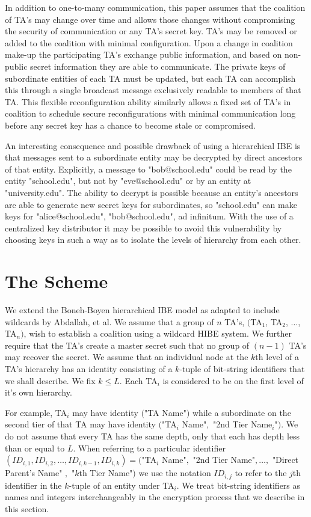 \documentclass[10pt]{article}
\begin{document}
In addition to one-to-many communication, this paper assumes that the coalition of TA's may change over time and allows those changes without compromising the security of communication or any TA's secret key.  TA's may be removed or added to the coalition with minimal configuration.  Upon a change in coalition make-up the participating TA's exchange public information, and based on non-public secret information they are able to communicate.  The private keys of subordinate entities of each TA must be updated, but each TA can accomplish this through a single broadcast message exclusively readable to members of that TA.  This flexible reconfiguration ability similarly allows a fixed set of TA's in coalition to schedule secure reconfigurations with minimal communication long before any secret key has a chance to become stale or compromised.

An interesting consequence and possible drawback of using a hierarchical IBE is that messages sent to a subordinate entity may be decrypted by direct ancestors of that entity.  Explicitly, a message to "bob@school.edu" could be read by the entity "school.edu", but not by "eve@school.edu" or by an entity at "university.edu".  The ability to decrypt is possible because an entity's ancestors are able to generate new secret keys for subordinates, so "school.edu" can make keys for "alice@school.edu", "bob@school.edu", ad infinitum.  With the use of a centralized key distributor it may be possible to avoid this vulnerability by choosing keys in such a way as to isolate the levels of hierarchy from each other.

\section*{The Scheme}

We extend the Boneh-Boyen hierarchical IBE model as adapted to include wildcards by Abdallah, et al.  We assume that a group of $n$ TA's, $($TA$_1$, TA$_2$, $\dots$, TA$_n)$, wish to establish a coalition using a wildcard HIBE system.  We further require that the TA's create a master secret such that no group of $(n-1)$ TA's may recover the secret. We assume that an individual node at the $k$th level of a TA's hierarchy has an identity consisting of a $k$-tuple of bit-string identifiers that we shall describe. We fix $k \le L$.  Each TA$_i$ is considered to be on the first level of it's own hierarchy.

For example, TA$_i$ may have identity $($"TA Name"$)$ while a subordinate on the second tier of that TA may have identity $($"TA$_i$ Name"$,$ "2nd Tier Name$_i$"$)$. We do not assume that every TA has the same depth, only that each has depth less than or equal to $L$.  When referring to a particular identifier $(ID_{i,1}, ID_{i,2}, \dots, ID_{i,k-1}, ID_{i,k}) = ($"TA$_i$ Name"$,$ "2nd Tier Name"$,\dots,$ "Direct Parent's Name" $,$ "$k$th Tier Name"$)$ we use the notation $ID_{i,j}$ to refer to the $j$th identifier in the $k$-tuple of an entity under TA$_i$.  We treat bit-string identifiers as names and integers interchangeably in the encryption process that we describe in this section.
\end{document}
